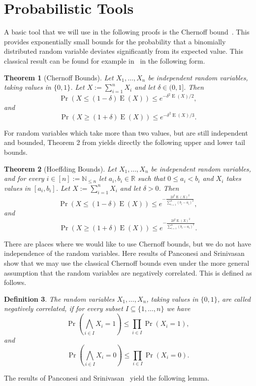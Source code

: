 \documentclass[12pt]{article}
\newtheorem{theorem}{Theorem}
\newtheorem{defi}[theorem]{Definition}
\DeclareMathOperator{\E}{E}
\newcommand{\NN}{{\mathbb{N}}}
\newcommand{\RR}{{\mathbb{R}}}
\begin{document}
{\section{Probabilistic Tools}\label{sec:tools}
A basic tool that we will use in the following proofs is the Chernoff bound~\cite{Chernoff}. 
This provides exponentially small bounds for the probability that a binomially 
distributed random variable deviates significantly from its expected value. 
This classical result can be found for example in~\cite{MU05} in the following form.
\begin{theorem}[Chernoff Bounds]
\label{thm:chernoff}
Let $X_1, \dots ,X_n$ be independent random variables, taking
values in $\{0, 1\}$. Let $\displaystyle X := \sum_{i=1}^n X_i$ and let $\delta \in (0,1]$. Then 
$$ \Pr\left(X \leq (1-\delta)\E (X)\right)\leq e^{-\delta^2\E (X)/2},$$
and
$$ \Pr\left(X \geq (1+\delta)\E (X)\right)\leq e^{-\delta^2\E (X)/3}.$$
\end{theorem}
For random variables which take more than two values, but are still independent and bounded, Theorem 2 from \cite{Hoe63} yields directly the following upper and lower tail bounds.
\begin{theorem}[Hoeffding Bounds]\label{thm:Hoeffding}
Let $X_1, \dots ,X_n$ be independent random variables, and for every $i \in [n] := \NN_{\leq n}$ let $a_i, b_i \in \RR$ such that $0 \leq a_i < b_i$ and $X_i$ takes
values in $[a_i, b_i]$. Let $\displaystyle X := \sum_{i=1}^n X_i$ and let $\delta > 0$. Then 
$$ \Pr\left(X \leq (1-\delta)\E (X)\right)\leq e^{-\frac{2\delta^2\E (X)^2}{\sum_{i=1}^n(b_i-a_i)^2}},$$
 and
$$ \Pr\left(X \geq (1+\delta)\E (X)\right)\leq e^{-\frac{2\delta^2\E (X)^2}{\sum_{i=1}^n(b_i-a_i)^2}}.$$
\end{theorem}
There are places where we would like to use Chernoff bounds, but we do not have independence of the random variables. Here results of Panconesi and Srinivasan~\cite{PS97,SrinFOCS2001} show that we may use the classical Chernoff bounds even under the more general assumption that the random variables are negatively correlated. This is defined as follows.

\begin{defi}
The random variables $X_1, \dots ,X_n$, taking
values in $\{0, 1\}$, are called {\emph{negatively correlated}}, if for every subset $I \subseteq \{1,\dots , n\}$ we have 
$$\Pr{\left(\bigwedge_{i \in I}X_i = 1\right)} \leq \prod_{i \in I}\Pr{\left(X_i = 1\right)},$$
and
$$\Pr{\left(\bigwedge_{i \in I}X_i = 0\right)} \leq \prod_{i \in I}\Pr{\left(X_i = 0\right)}.$$
\end{defi}
The results of Panconesi and Srinivasan~\cite{PS97,SrinFOCS2001} yield the following lemma.

}
\end{document}
